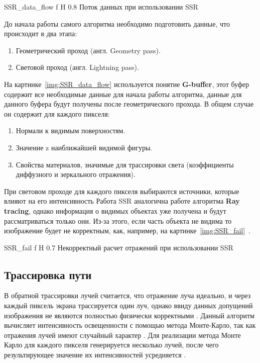 {SSR_data_flow} %
{f} %
{H} %
{0.8\textwidth} %
{Поток данных при использовании SSR} %



До начала работы самого алгоритма необходимо подготовить данные, что происходит в два этапа:
\begin{enumerate}
	\item Геометрический проход (англ. Geometry pass).
	\item Световой проход (англ. Lightning pass).
\end{enumerate}

На картинке~\ref{img:SSR_data_flow} используется понятие \textbf{G-buffer}, этот буфер содержит все необходимые данные для начала работы алгоритма, данные для данного буфера
будут получены после геометрического прохода. В общем случае он содержит для каждого пикселя:
\begin{enumerate}
	\item Нормали к видимым поверхностям.
	\item Значение z наиближайшей видимой фигуры.
	\item Свойства материалов, значимые для трассировки света (коэффициенты диффузного и зеркального отражения).
\end{enumerate}
При световом проходе для каждого пикселя выбираются источники, которые влияют на его интенсивность
Работа SSR аналогична работе алгоритма \textbf{Ray tracing}, однако информация о видимых объектах уже получена и будут рассматриваться только они.
Из-за этого, если часть объекта не видима то изображение будет не корректным, как, например, на картинке~\ref{img:SSR_fail}~\cite{SSR,reflexion_types}.


{SSR_fail} %
{f} %
{H} %
{0.7\textwidth} %
{Некорректный расчет отражений при использовании SSR} %





\subsection{Трассировка пути}
В обратной трассировки лучей считается, что отражение луча идеально,  и через каждый пиксель экрана трассируется один луч, однако ввиду данных допущений
изображения не являются полностью физически корректными \cite{ray_path_tracing}.
Данный алгоритм вычисляет интенсивность освещенности с помощью метода Монте-Карло, так как отражения лучей имеют случайный характер \cite{monte_carlo}.
Для реализации метода Монте Карло  для каждого пикселя генерируется несколько  лучей,
после чего результирующее значение их интенсивностей усредняется \cite{path_tracing_def}.

